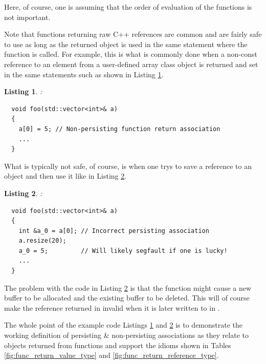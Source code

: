 \documentclass[pdf,ps2pdf,11pt]{SANDreport}
\newtheorem{listing}{Listing}
\begin{document}
Here, of course, one is assuming that the order of evaluation of the
functions is not important.

Note that functions returning raw C++ references are common and are
fairly safe to use as long as the returned object is used in the same
statement where the function is called.  For example, this is what is
commonly done when a non-const reference to an element from a
user-defined array class object is returned and set in the same
statements such as shown in Listing
{}\ref{listing:non-persisting-array-return-1}.

\begin{listing}:\\
\label{listing:non-persisting-array-return-1}
{\small\begin{verbatim}
  void foo(std::vector<int>& a)
  {
    a[0] = 5; // Non-persisting function return association
    ...
  }
\end{verbatim}}
\end{listing}

What is typically not safe, of course, is when one trys to save a
reference to an object and then use it like in Listing
{}\ref{listing:bad-persisting-array-return-1}.

\begin{listing}:\\
\label{listing:bad-persisting-array-return-1}
{\small\begin{verbatim}
  void foo(std::vector<int>& a)
  {
    int &a_0 = a[0]; // Incorrect persisting association
    a.resize(20);
    a_0 = 5;         // Will likely segfault if one is lucky!
    ...
  }
\end{verbatim}}
\end{listing}

The problem with the code in Listing
{}\ref{listing:bad-persisting-array-return-1} is that the
{} function might cause a new buffer to be
allocated and the existing buffer to be deleted.  This will of course
make the reference returned in {} invalid
when it is later written to in {}.

The whole point of the example code Listings
{}\ref{listing:non-persisting-array-return-1} and
{}\ref{listing:bad-persisting-array-return-1} is to demonstrate the
working definition of persisting \& non-persisting associations as
they relate to objects returned from functions and support the idioms
shown in Tables {}\ref{fig:func_return_value_type} and
{}\ref{fig:func_return_reference_type}.
\end{document}
